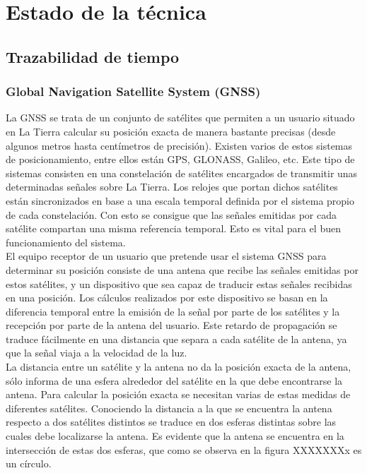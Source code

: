 \chapter{Estado de la técnica}
\section{Trazabilidad de tiempo}
\subsection{Global Navigation Satellite System (GNSS)}
La GNSS se trata de un conjunto de satélites que permiten a un usuario situado en La Tierra calcular su posición exacta de manera bastante precisas (desde algunos metros hasta centímetros de precisión). Existen varios de estos sistemas de posicionamiento, entre ellos están GPS, GLONASS, Galileo, etc. Este tipo de sistemas consisten en una constelación de satélites encargados de transmitir unas determinadas señales sobre La Tierra. Los relojes que portan dichos satélites están sincronizados en base a una escala temporal definida por el sistema propio de cada constelación. Con esto se consigue que las señales emitidas por cada satélite compartan una misma referencia temporal. Esto es vital para el buen funcionamiento del sistema. \\
El equipo receptor de un usuario que pretende usar el sistema GNSS para determinar su posición consiste de una antena que recibe las señales emitidas por estos satélites, y un dispositivo que sea capaz de traducir estas señales recibidas en una posición. Los cálculos realizados por este dispositivo se basan en la diferencia temporal entre la emisión de la señal por parte de los satélites y la recepción por parte de la antena del usuario. Este retardo de propagación se traduce fácilmente en una distancia que separa a cada satélite de la antena, ya que la señal viaja a la velocidad de la luz. \\
La distancia entre un satélite y la antena no da la posición exacta de la antena, sólo informa de una esfera alrededor del satélite en la que debe encontrarse la antena. Para calcular la posición exacta se necesitan varias de estas medidas de diferentes satélites. Conociendo la distancia a la que se encuentra la antena respecto a dos satélites distintos se traduce en dos esferas distintas sobre las cuales debe localizarse la antena. Es evidente que la antena se encuentra en la intersección de estas dos esferas, que como se observa en la figura XXXXXXXx es un círculo.


